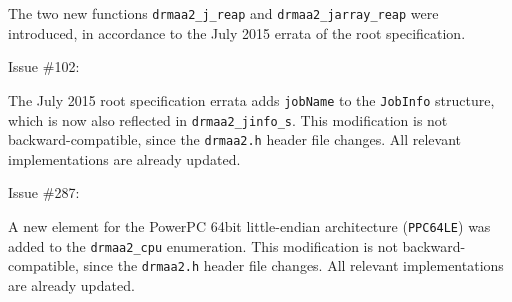 \documentclass{article}
\newcommand{\h}[1]{\texttt{#1}}
\begin{document}
The two new functions \h{drmaa2\_j\_reap} and \h{drmaa2\_jarray\_reap} were introduced, in accordance to the July 2015 errata of the root specification.

Issue \#102:

The July 2015 root specification errata adds \h{jobName} to the \h{JobInfo} structure, which is now also reflected in \h{drmaa2\_jinfo\_s}. This modification is not backward-compatible, since the \h{drmaa2.h} header file changes. All relevant implementations are already updated.

Issue \#287:

A new element for the PowerPC 64bit little-endian architecture (\h{PPC64LE}) was added to the \h{drmaa2\_cpu} enumeration. This modification is not backward-compatible, since the \h{drmaa2.h} header file changes. All relevant implementations are already updated.
\end{document}
